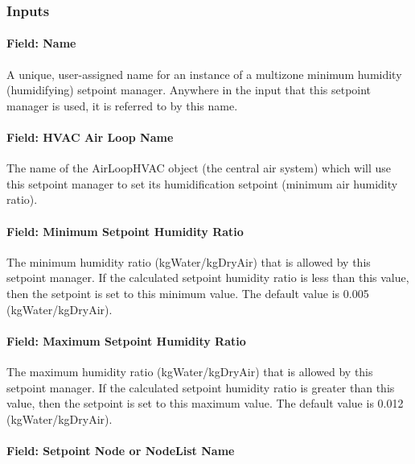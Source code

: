 \subsubsection{Inputs}\label{inputs-18-007}

\paragraph{Field: Name}\label{field-name-18-006}

A unique, user-assigned name for an instance of a multizone minimum humidity (humidifying) setpoint manager. Anywhere in the input that this setpoint manager is used, it is referred to by this name.

\paragraph{Field: HVAC Air Loop Name}\label{field-hvac-air-loop-name-8}

The name of the AirLoopHVAC object (the central air system) which will use this setpoint manager to set its humidification setpoint (minimum air humidity ratio).

\paragraph{Field: Minimum Setpoint Humidity Ratio}\label{field-minimum-setpoint-humidity-ratio-3}

The minimum humidity ratio (kgWater/kgDryAir) that is allowed by this setpoint manager. If the calculated setpoint humidity ratio is less than this value, then the setpoint is set to this minimum value. The default value is 0.005 (kgWater/kgDryAir).

\paragraph{Field: Maximum Setpoint Humidity Ratio}\label{field-maximum-setpoint-humidity-ratio-3}

The maximum humidity ratio (kgWater/kgDryAir) that is allowed by this setpoint manager. If the calculated setpoint humidity ratio is greater than this value, then the setpoint is set to this maximum value. The default value is 0.012 (kgWater/kgDryAir).

\paragraph{Field: Setpoint Node or NodeList Name}\label{field-setpoint-node-or-nodelist-name-17}

